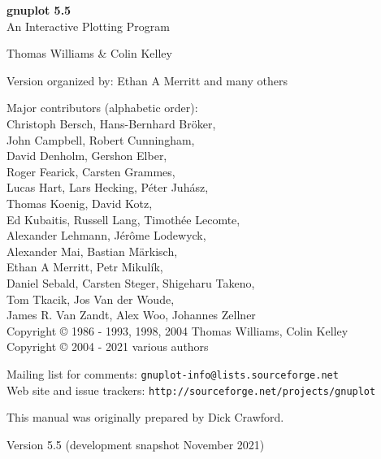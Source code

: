 \documentclass[twoside]{article}
\def\gpVersion{5.5}
\def\gnuplotVersion{\usebox\GpVersion}
\begin{document}
\sloppy
\thispagestyle{empty}
\rule{0in}{1.0in}

  \begin{center}

  {\huge\bf {gnuplot \gpVersion}}\\
  \vspace{3ex}
  {\Large An Interactive Plotting Program}\\

  \vspace{2ex}

  \large
  Thomas Williams \& Colin Kelley\\

  \vspace{2ex}

  Version
    {\gnuplotVersion }
  organized by: Ethan A Merritt and many others\\

   \vspace{2ex}

  Major contributors (alphabetic order):\\

  Christoph Bersch,
  Hans-Bernhard Bröker,\\
  John Campbell,
  Robert Cunningham,\\
  David Denholm,
  Gershon Elber,\\
  Roger Fearick,
  Carsten Grammes,\\
  Lucas Hart,
  Lars Hecking,
  Péter Juhász,\\
  Thomas Koenig,
  David Kotz,\\
  Ed Kubaitis,
  Russell Lang,
  Timothée Lecomte,\\
  Alexander Lehmann,
  Jérôme Lodewyck,\\
  Alexander Mai,
  Bastian Märkisch, \\
  Ethan A Merritt,
  Petr Mikulík,\\
  Daniel Sebald,
  Carsten Steger,
  Shigeharu Takeno,\\
  Tom Tkacik,
  Jos Van der Woude,\\
  James R. Van Zandt,
  Alex Woo,
  Johannes Zellner\\
  Copyright {\copyright} 1986 - 1993, 1998, 2004   Thomas Williams, Colin Kelley\\
  Copyright {\copyright} 2004 - 2021  various authors\\

  \vspace{2ex}

  Mailing list for comments: \verb+gnuplot-info@lists.sourceforge.net+\\
  Web site and issue trackers: \verb+http://sourceforge.net/projects/gnuplot+

  \vfill
  This manual was originally prepared by Dick Crawford. \\

  \vspace{2ex}

   Version {\gpVersion} (development snapshot November 2021)

   \end{center}
\newpage


\hypertarget{TableOfContents}{}
\tableofcontents

\newpage
\end{document}
